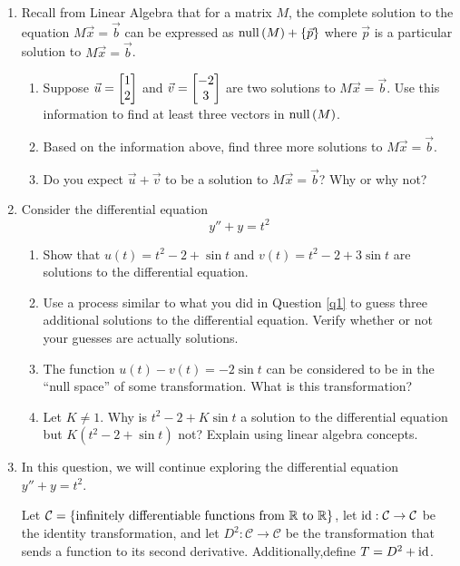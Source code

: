 \begin{enumerate}
	\item\label{q1}
	Recall from Linear Algebra that for a matrix $M$, the complete solution to the equation $M\vec x=\vec b$ can be expressed as
	$
		\mathrm{null}\,(M)+\{\vec p\}
	$
		where $\vec p$ is a particular solution to $M\vec x=\vec b$.
		
	\begin{enumerate}
		\item Suppose $\vec u=\begin{bmatrix}1\\2\end{bmatrix}$ and $\vec v=\begin{bmatrix}-2\\3\end{bmatrix}$ are two solutions to $M\vec x=\vec b$. Use this information
		to find at least three vectors in $\mathrm{null}\,(M)$.
		\item Based on the information above, find three more solutions to $M\vec x=\vec b$.
		\item Do you expect $\vec u+\vec v$ to be a solution to $M\vec x=\vec b$? Why or why not?
	\end{enumerate}

	\item Consider the differential equation
	\[
		y''+y=t^2
	\]
	\begin{enumerate}
		\item Show that $u(t)=t^2-2+\sin t$ and $v(t)=t^2-2+3\sin t$ are solutions to the differential equation.
		\item Use a process similar to what you did in Question \ref{q1} to guess three additional solutions to the differential equation. Verify
		whether or not your guesses are actually solutions.
		\item The function $u(t)-v(t)=-2\sin t$ can be considered to be in the ``null space'' of some transformation. What is this transformation?
		\item Let $K\neq 1$. Why is $t^2-2+K\sin t$ a solution to the differential equation but $K(t^2-2+\sin t)$ not? Explain using linear algebra concepts.
	\end{enumerate}

	\item In this question, we will continue exploring the differential equation $y''+y=t^2$.
	
	Let $\mathcal C=\{\text{infinitely differentiable functions from $\mathbb{R}$ to $\mathbb{R}$}\}$, let $\operatorname{id}:\mathcal C\to\mathcal C$
	be the identity transformation, and let $D^2:\mathcal C\to\mathcal C$ be the transformation that sends a function to its second derivative.
	Additionally,define $T=D^2+\operatorname{id}$.


\end{enumerate}
